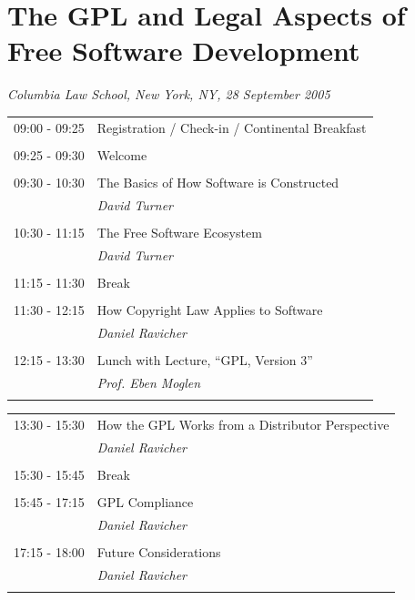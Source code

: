 \documentclass[11pt, letterpaper]{book}
\begin{document}
\pagestyle{plain}


\chapter*{The GPL and Legal Aspects of Free Software Development}

\textit{Columbia Law School, New York, NY, 28 September 2005}

\begin{tabular}[t]{ll}
09:00 - 09:25 & Registration / Check-in / Continental Breakfast\\
&\\
09:25 - 09:30 & Welcome\\
&\\
09:30 - 10:30 & The Basics of How Software is Constructed\\
& \textit{David Turner}\\
&\\
10:30 - 11:15 & The Free Software Ecosystem\\
& \textit{David Turner}\\
&\\
11:15 - 11:30 & Break\\
&\\
11:30 - 12:15 & How Copyright Law Applies to Software\\
& \textit{Daniel Ravicher}\\
&\\
12:15 - 13:30 & Lunch with Lecture, ``GPL, Version 3''\\
& \textit{Prof. Eben Moglen}\\
&\\
\end{tabular}

\begin{tabular}[t]{ll}
13:30 - 15:30 & How the GPL Works from a Distributor Perspective\\
& \textit{Daniel Ravicher}\\
&\\
15:30 - 15:45 & Break\\
&\\
15:45 - 17:15 & GPL Compliance\\
& \textit{Daniel Ravicher}\\
&\\
17:15 - 18:00 & Future Considerations\\
& \textit{Daniel Ravicher}\\
&\\
\end{tabular}
\end{document}
